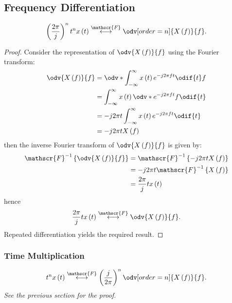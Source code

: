 \documentclass{article}
\begin{document}
\subsection{Frequency Differentiation}
\begin{equation*}
    \left( \frac{2\pi}{j} \right)^n t^n x\left( t \right) \overset{\mathscr{F}}{\longleftrightarrow} \odv[order=n]{X\left( f \right)}{f}.
\end{equation*}
\begin{proof}
    Consider the representation of \(\odv{X\left( f \right)}{f}\) using the Fourier transform:
    \begin{align*}
        \odv{X\left( f \right)}{f} & = \odv*{\int_{-\infty}^\infty x\left( t \right) e^{-j 2\pi f t}\odif{t}}{f} \\
                                   & = \int_{-\infty}^\infty x\left( t \right) \odv*{e^{-j 2\pi f t}}{f}\odif{t} \\
                                   & = -j 2\pi t \int_{-\infty}^\infty x\left( t \right) e^{-j 2\pi f t}\odif{t} \\
                                   & = -j 2\pi t X\left( f \right)
    \end{align*}
    then the inverse Fourier transform of \(\odv{X\left( f \right)}{f}\) is given by:
    \begin{align*}
        \mathscr{F}^{-1}\left\{ \odv{X\left( f \right)}{f} \right\} & = \mathscr{F}^{-1}\left\{ -j 2\pi t X\left( f \right) \right\} \\
                                                                    & = -j 2\pi t \mathscr{F}^{-1}\left\{ X\left( f \right) \right\} \\
                                                                    & = \frac{2\pi}{j} t x\left( t \right)
    \end{align*}
    hence
    \begin{equation*}
        \frac{2\pi}{j} t x\left( t \right) \overset{\mathscr{F}}{\longleftrightarrow} \odv{X\left( f \right)}{f}.
    \end{equation*}
    Repeated differentiation yields the required result.
\end{proof}
\subsubsection{Time Multiplication}
\begin{equation*}
    t^n x\left( t \right) \overset{\mathscr{F}}{\longleftrightarrow} \left( \frac{j}{2\pi} \right)^n \odv[order=n]{X\left( f \right)}{f}.
\end{equation*}
\textit{See the previous section for the proof.}
\end{document}
